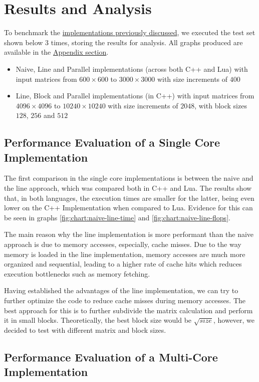 \section{Results and Analysis} \label{section:results}

To benchmark the \hyperref[section:algorithms]{implementations previously discussed}, we executed the test set shown below 3 %
times, storing the results for analysis. All graphs produced are available in the \hyperref[section:appendix]{Appendix section}.

\begin{itemize}
    \item Naive, Line and Parallel implementations (across both C++ and Lua) with input matrices from $600 \times 600$ to $3000 \times 3000$ with size increments of $400$
    \item Line, Block and Parallel implementations (in C++) with input matrices from $4096 \times 4096$ to $10240 \times 10240$ with size increments of $2048$, with block sizes $128$, $256$ and $512$
\end{itemize}

\subsection{Performance Evaluation of a Single Core Implementation}

The first comparison in the single core implementations is between the naive and the line approach, which was compared both in C++ and Lua. The results show that, in both languages, the execution times are smaller for the latter, being even lower on the C++ Implementation when compared to Lua. Evidence for this can be seen in graphs \ref{fig:chart:naive-line-time} and \ref{fig:chart:naive-line-flops}.

The main reason why the line implementation is more performant than the naive approach is due to memory accesses, especially, cache misses. Due to the way memory is loaded in the line implementation, memory accesses are much more organized and sequential, leading to a higher rate of cache hits which reduces execution bottlenecks such as memory fetching. 


Having established the advantages of the line implementation, we can try to further optimize the code to reduce cache misses during memory accesses. The best approach for this is to further subdivide the matrix calculation and perform it in small blocks. Theoretically, the best block size would be $\sqrt {size}$, however, we decided to test with different matrix and block sizes.


\subsection{Performance Evaluation of a Multi-Core Implementation}

